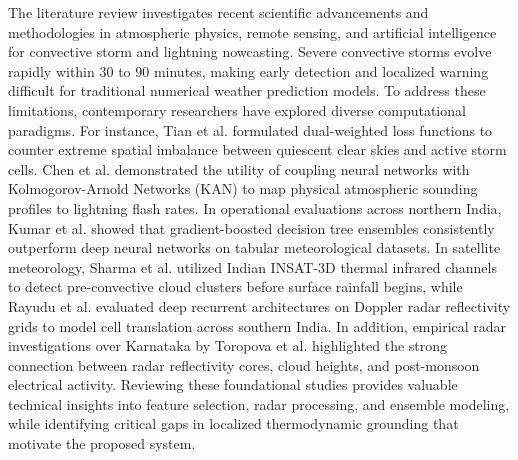 \documentclass[12pt,a4paper]{report}
\begin{document}
The literature review investigates recent scientific advancements and methodologies in atmospheric physics, remote sensing, and artificial intelligence for convective storm and lightning nowcasting. Severe convective storms evolve rapidly within $30$ to $90$ minutes, making early detection and localized warning difficult for traditional numerical weather prediction models. To address these limitations, contemporary researchers have explored diverse computational paradigms. For instance, Tian et al. \cite{tian2026dual} formulated dual-weighted loss functions to counter extreme spatial imbalance between quiescent clear skies and active storm cells. Chen et al. \cite{chen2026clka} demonstrated the utility of coupling neural networks with Kolmogorov-Arnold Networks (KAN) to map physical atmospheric sounding profiles to lightning flash rates. In operational evaluations across northern India, Kumar et al. \cite{kumar2026enhancing} showed that gradient-boosted decision tree ensembles consistently outperform deep neural networks on tabular meteorological datasets. In satellite meteorology, Sharma et al. \cite{sharma2025insat} utilized Indian INSAT-3D thermal infrared channels to detect pre-convective cloud clusters before surface rainfall begins, while Rayudu et al. \cite{rayudu2025prediction} evaluated deep recurrent architectures on Doppler radar reflectivity grids to model cell translation across southern India. In addition, empirical radar investigations over Karnataka by Toropova et al. \cite{toropova2022characteristics} highlighted the strong connection between radar reflectivity cores, cloud heights, and post-monsoon electrical activity. Reviewing these foundational studies provides valuable technical insights into feature selection, radar processing, and ensemble modeling, while identifying critical gaps in localized thermodynamic grounding that motivate the proposed system.
\end{document}
